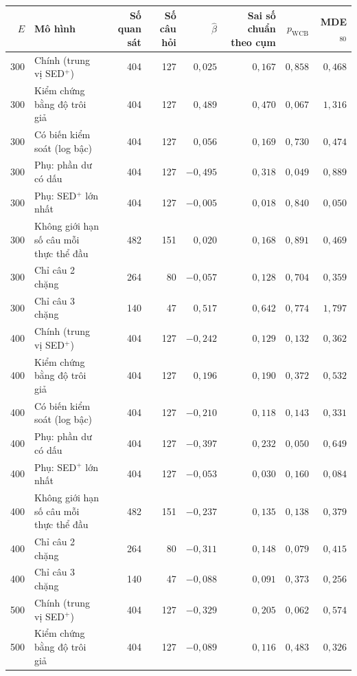 \begin{tabular}{rlrrrrrr}
\toprule
$E$ & Mô hình & Số quan sát & Số câu hỏi & $\hat\beta$ & Sai số chuẩn theo cụm & $p_{\mathrm{WCB}}$ & MDE$_{80}$ \\
\midrule
300 & Chính (trung vị SED$^+$) & 404 & 127 & $0{,}025$ & $0{,}167$ & $0{,}858$ & $0{,}468$ \\
300 & Kiểm chứng bằng độ trôi giả & 404 & 127 & $0{,}489$ & $0{,}470$ & $0{,}067$ & $1{,}316$ \\
300 & Có biến kiểm soát (log bậc) & 404 & 127 & $0{,}056$ & $0{,}169$ & $0{,}730$ & $0{,}474$ \\
300 & Phụ: phần dư có dấu & 404 & 127 & $-0{,}495$ & $0{,}318$ & $0{,}049$ & $0{,}889$ \\
300 & Phụ: SED$^+$ lớn nhất & 404 & 127 & $-0{,}005$ & $0{,}018$ & $0{,}840$ & $0{,}050$ \\
300 & Không giới hạn số câu mỗi thực thể đầu & 482 & 151 & $0{,}020$ & $0{,}168$ & $0{,}891$ & $0{,}469$ \\
300 & Chỉ câu 2 chặng & 264 & 80 & $-0{,}057$ & $0{,}128$ & $0{,}704$ & $0{,}359$ \\
300 & Chỉ câu 3 chặng & 140 & 47 & $0{,}517$ & $0{,}642$ & $0{,}774$ & $1{,}797$ \\
\midrule
400 & Chính (trung vị SED$^+$) & 404 & 127 & $-0{,}242$ & $0{,}129$ & $0{,}132$ & $0{,}362$ \\
400 & Kiểm chứng bằng độ trôi giả & 404 & 127 & $0{,}196$ & $0{,}190$ & $0{,}372$ & $0{,}532$ \\
400 & Có biến kiểm soát (log bậc) & 404 & 127 & $-0{,}210$ & $0{,}118$ & $0{,}143$ & $0{,}331$ \\
400 & Phụ: phần dư có dấu & 404 & 127 & $-0{,}397$ & $0{,}232$ & $0{,}050$ & $0{,}649$ \\
400 & Phụ: SED$^+$ lớn nhất & 404 & 127 & $-0{,}053$ & $0{,}030$ & $0{,}160$ & $0{,}084$ \\
400 & Không giới hạn số câu mỗi thực thể đầu & 482 & 151 & $-0{,}237$ & $0{,}135$ & $0{,}138$ & $0{,}379$ \\
400 & Chỉ câu 2 chặng & 264 & 80 & $-0{,}311$ & $0{,}148$ & $0{,}079$ & $0{,}415$ \\
400 & Chỉ câu 3 chặng & 140 & 47 & $-0{,}088$ & $0{,}091$ & $0{,}373$ & $0{,}256$ \\
\midrule
500 & Chính (trung vị SED$^+$) & 404 & 127 & $-0{,}329$ & $0{,}205$ & $0{,}062$ & $0{,}574$ \\
500 & Kiểm chứng bằng độ trôi giả & 404 & 127 & $-0{,}089$ & $0{,}116$ & $0{,}483$ & $0{,}326$ \\

\end{tabular}
